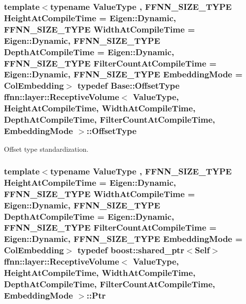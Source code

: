 \hypertarget{classffnn_1_1layer_1_1_receptive_volume_a1844c5ef59193938758e778eb0530ba6}{
\subsubsection[{Offset\-Type}]{\setlength{\rightskip}{0pt plus 5cm}template$<$typename Value\-Type , F\-F\-N\-N\-\_\-\-S\-I\-Z\-E\-\_\-\-T\-Y\-P\-E Height\-At\-Compile\-Time = Eigen\-::\-Dynamic, F\-F\-N\-N\-\_\-\-S\-I\-Z\-E\-\_\-\-T\-Y\-P\-E Width\-At\-Compile\-Time = Eigen\-::\-Dynamic, F\-F\-N\-N\-\_\-\-S\-I\-Z\-E\-\_\-\-T\-Y\-P\-E Depth\-At\-Compile\-Time = Eigen\-::\-Dynamic, F\-F\-N\-N\-\_\-\-S\-I\-Z\-E\-\_\-\-T\-Y\-P\-E Filter\-Count\-At\-Compile\-Time = Eigen\-::\-Dynamic, F\-F\-N\-N\-\_\-\-S\-I\-Z\-E\-\_\-\-T\-Y\-P\-E Embedding\-Mode = Col\-Embedding$>$ typedef {\bf Base\-::\-Offset\-Type} {\bf ffnn\-::layer\-::\-Receptive\-Volume}$<$ Value\-Type, Height\-At\-Compile\-Time, Width\-At\-Compile\-Time, Depth\-At\-Compile\-Time, Filter\-Count\-At\-Compile\-Time, {\bf Embedding\-Mode} $>$\-::{\bf Offset\-Type}}}\label{classffnn_1_1layer_1_1_receptive_volume_a1844c5ef59193938758e778eb0530ba6}


Offset type standardization. 

\hypertarget{classffnn_1_1layer_1_1_receptive_volume_a1c32fe58cfaa6873d328d36eada78a7f}{
\subsubsection[{Ptr}]{\setlength{\rightskip}{0pt plus 5cm}template$<$typename Value\-Type , F\-F\-N\-N\-\_\-\-S\-I\-Z\-E\-\_\-\-T\-Y\-P\-E Height\-At\-Compile\-Time = Eigen\-::\-Dynamic, F\-F\-N\-N\-\_\-\-S\-I\-Z\-E\-\_\-\-T\-Y\-P\-E Width\-At\-Compile\-Time = Eigen\-::\-Dynamic, F\-F\-N\-N\-\_\-\-S\-I\-Z\-E\-\_\-\-T\-Y\-P\-E Depth\-At\-Compile\-Time = Eigen\-::\-Dynamic, F\-F\-N\-N\-\_\-\-S\-I\-Z\-E\-\_\-\-T\-Y\-P\-E Filter\-Count\-At\-Compile\-Time = Eigen\-::\-Dynamic, F\-F\-N\-N\-\_\-\-S\-I\-Z\-E\-\_\-\-T\-Y\-P\-E Embedding\-Mode = Col\-Embedding$>$ typedef boost\-::shared\-\_\-ptr$<${\bf Self}$>$ {\bf ffnn\-::layer\-::\-Receptive\-Volume}$<$ Value\-Type, Height\-At\-Compile\-Time, Width\-At\-Compile\-Time, Depth\-At\-Compile\-Time, Filter\-Count\-At\-Compile\-Time, {\bf Embedding\-Mode} $>$\-::{\bf Ptr}}}\label{classffnn_1_1layer_1_1_receptive_volume_a1c32fe58cfaa6873d328d36eada78a7f}


